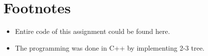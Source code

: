\section{Footnotes}

\begin{itemize}
    \item Entire code of this assignment could be found here. \href{https://gist.github.com/1-Harshit/0958e93a5df2323b7431b424b34c2aca}{\faGithub}
    \item The programming was done in C++ by implementing 2-3 tree.
\end{itemize}